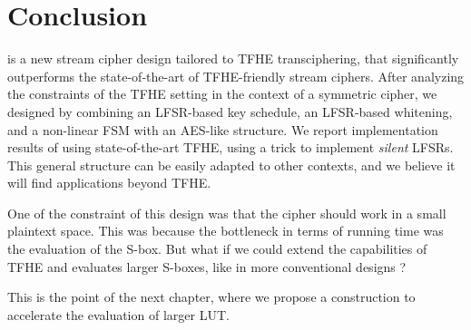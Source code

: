 \section{Conclusion}
\label{sec:conclusion}


\coolName{} is a new stream cipher design tailored to \gls{TFHE}
transciphering, that significantly outperforms the state-of-the-art of
\gls{TFHE}-friendly stream ciphers.  After analyzing the constraints of the
\gls{TFHE} setting in the context of a symmetric cipher, we designed
\coolName{} by combining an LFSR-based key schedule, an LFSR-based
whitening, and a non-linear FSM with an \gls{AES}-like structure.  We report
implementation results of \coolName{} using state-of-the-art \gls{TFHE}, using
a trick to implement \emph{silent} LFSRs.  This general structure can be
easily adapted to other contexts, and we believe it will find
applications beyond \gls{TFHE}.


One of the constraint of this design was that the cipher should work in a small plaintext space. This was because the bottleneck in terms of running time was the evaluation of the \gls{S-box}. But what if we could extend the capabilities of \gls{TFHE} and evaluates larger \gls{S-box}es, like in more conventional designs ?

This is the point of the next chapter, where we propose a construction to accelerate the evaluation of larger \gls{LUT}.

